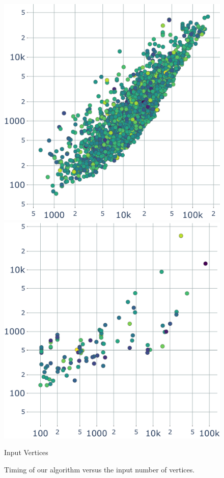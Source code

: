 \begin{figure}
    \parbox{.3\linewidth}{\includegraphics[width=\linewidth]{curve_meshing_in_shell_tex/figs/stats/time_ABC}}\hfill
    \parbox{.3\linewidth}{\includegraphics[width=\linewidth]{curve_meshing_in_shell_tex/figs/stats/time_PoLyCube}}\par
    \scriptsize{Input Vertices}
    \caption{Timing of our algorithm versus the input number of vertices.}
    \label{bichon:fig:timings}
\end{figure}

